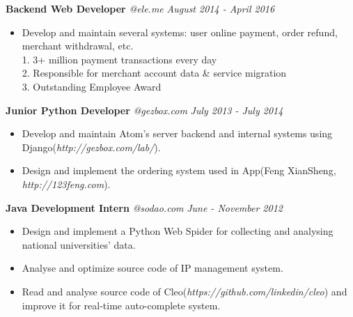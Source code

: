 ﻿\documentclass[9pt]{article}
\newenvironment{changemargin}[2]{%
  \begin{list}{}{%
    \setlength{\topsep}{0pt}%
    \setlength{\leftmargin}{#1}%
    \setlength{\rightmargin}{#2}%
    \setlength{\listparindent}{\parindent}%
    \setlength{\itemindent}{\parindent}%
    \setlength{\parsep}{\parskip}%
  }%
  \item[]}{\end{list}
}
\newenvironment{body} {
	\vspace*{-16pt}
	\begin{changemargin}{-0.25in}{-0.5in}
  }
	{\end{changemargin}
}
\begin{document}
\begin{body}
    \textbf{Backend Web Developer} \emph{@ele.me} \hfill \emph{August 2014 - April 2016}\\
    \vspace*{-4pt}
    \begin{itemize} \itemsep -0pt  %
        \item Develop and maintain several systems: user online payment, order refund, merchant withdrawal, etc.\\
        1. 3+ million payment transactions every day\\
        2. Responsible for merchant account data \& service migration\\
        3. Outstanding Employee Award\\
    \end{itemize}

    \textbf{Junior Python Developer} \emph{@gezbox.com} \hfill \emph{July 2013 - July 2014}\\
    \vspace*{-4pt}
    \begin{itemize} \itemsep -0pt  %
        \item Develop and maintain Atom's server backend and internal systems using Django(\emph{http://gezbox.com/lab/}).
        \item Design and implement the ordering system used in App(Feng XianSheng, \emph{http://123feng.com}).
    \end{itemize}

	\textbf{Java Development Intern} \emph{@sodao.com} \hfill \emph{June - November 2012}\\
	\vspace*{-4pt}
	\begin{itemize} \itemsep -0pt  %
		\item Design and implement a Python Web Spider for collecting and analysing national universities' data.
        \item Analyse and optimize source code of IP management system.
        \item Read and analyse source code of Cleo(\emph{https://github.com/linkedin/cleo}) and improve it for real-time auto-complete system.
	\end{itemize}

\end{body}

\smallskip

\end{document}
